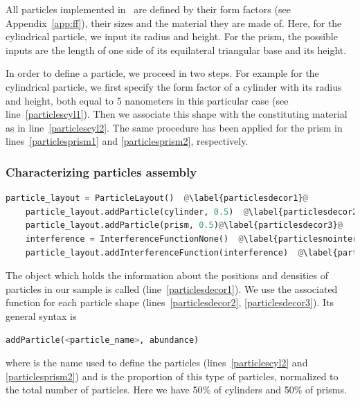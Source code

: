 All particles implemented in \BornAgain\ are defined by their
form factors (see Appendix~\ref{app:ff}), their sizes and the material
they are made of. Here, for the
cylindrical particle, we input its radius and height.  For the prism,
the possible inputs are the length of one side of its equilateral triangular
base and its height.

In order to define a particle, we proceed in two steps. For example for
the cylindrical particle, we first specify the form factor of a cylinder with
its radius and height, both equal to 5 nanometers in this particular
case (see line~\ref{particlescyl1}). Then we associate this shape with
the constituting material as in line~\ref{particlescyl2}.
The same procedure has been applied for the prism in lines~\ref{particlesprism1} and \ref{particlesprism2}, respectively.

\subsubsection{Characterizing particles assembly}
\begin{lstlisting}[language=python, style=eclipseboxed, name=ex1,nolol]
    particle_layout = ParticleLayout()  @\label{particlesdecor1}@
    particle_layout.addParticle(cylinder, 0.5)  @\label{particlesdecor2}@
    particle_layout.addParticle(prism, 0.5)@\label{particlesdecor3}@
    interference = InterferenceFunctionNone()  @\label{particlesnointerf}@
    particle_layout.addInterferenceFunction(interference)  @\label{particlesinterf}@
\end{lstlisting}
The object which holds the information about the positions and densities of particles
in our sample is called 
(line~\ref{particlesdecor1}). We use the associated function 
for each particle shape (lines~\ref{particlesdecor2}, \ref{particlesdecor3}). Its general syntax is

\begin{lstlisting}[language=python, style=eclipse,numbers=none]
addParticle(<particle_name>, abundance)
\end{lstlisting}
where  is the name used to define the particles
(lines~\ref{particlescyl2} and \ref{particlesprism2}) and
 is the proportion of this type of particles,
normalized to the total number of particles. Here we have 50\% of cylinders
and 50\% of prisms.

